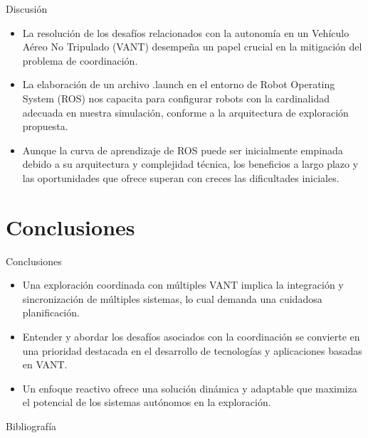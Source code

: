 \documentclass[
  24pt, %
  aspectratio=169, %
]{beamer}
\begin{document}
\begin{frame}{Discusión}
  \begin{itemize}
  \item La resolución de los desafíos relacionados con la autonomía en un Vehículo Aéreo No Tripulado (VANT) desempeña un papel crucial en la mitigación del problema de coordinación.
  \item La elaboración de un archivo .launch en el entorno de Robot Operating System (ROS) nos capacita para configurar robots con la cardinalidad adecuada en nuestra simulación, conforme a la arquitectura de exploración propuesta.
  \item Aunque la curva de aprendizaje de ROS puede ser inicialmente empinada debido a su arquitectura y complejidad técnica, los beneficios a largo plazo y las oportunidades que ofrece superan con creces las dificultades iniciales.
  \end{itemize}
\end{frame}

\section{Conclusiones}
\begin{frame}{Conclusiones}
  \begin{itemize}
  \item Una exploración coordinada con múltiples VANT implica la integración y sincronización de múltiples sistemas, lo cual demanda una cuidadosa planificación.
  \item Entender y abordar los desafíos asociados con la coordinación se convierte en una prioridad destacada en el desarrollo de tecnologías y aplicaciones basadas en VANT.
  \item Un enfoque reactivo ofrece una solución dinámica y adaptable que maximiza el potencial de los sistemas autónomos en la exploración.
  \end{itemize}
\end{frame}


\begin{frame}{Bibliografía}
  \tiny
  
  
\end{frame}
\end{document}
